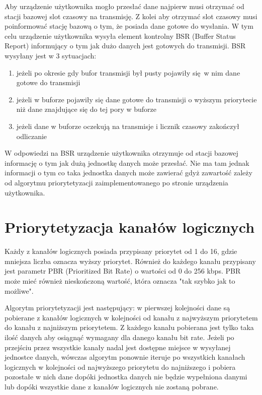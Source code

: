 Aby urządzenie użytkownika mogło przesłać dane najpierw musi otrzymać od stacji bazowej slot czasowy na transmisję. Z kolei aby otrzymać slot czasowy musi poinformować stację bazową o tym, że posiada dane gotowe do wysłania. W tym celu urządzenie użytkownika wysyła element kontrolny BSR (Buffer Status Report) informujący o tym jak dużo danych jest gotowych do transmisji. BSR wysyłany jest w 3 sytuacjach:

\begin{enumerate}
	\item jeżeli po okresie gdy bufor transmisji był pusty pojawiły się w nim dane gotowe do transmisji
	\item jeżeli w buforze pojawiły się dane gotowe do transmisji o wyższym priorytecie niż dane znajdujące się do tej pory w buforze
	\item jeżeli dane w buforze oczekują na transmisje i licznik czasowy zakończył odliczanie
\end{enumerate}

W odpowiedzi na BSR urządzenie użytkownika otrzymuje od stacji bazowej informację o tym jak dużą jednostkę danych może przesłać. Nie ma tam jednak informacji o tym co taka jednostka danych może zawierać gdyż zawartość zależy od algorytmu priorytetyzacji zaimplementowanego po stronie urządzenia użytkownika.

\section{Priorytetyzacja kanałów logicznych}

Każdy z kanałów logicznych posiada przypisany priorytet od 1 do 16, gdzie mniejsza liczba oznacza wyższy priorytet. Również do każdego kanału przypisany jest parametr PBR (Prioritized Bit Rate) o wartości od 0 do 256 kbps. PBR może mieć również nieskończoną wartość, która oznacza "tak szybko jak to możliwe".

Algorytm priorytetyzacji jest następujący: w pierwszej kolejności dane są pobierane z kanałów logicznych w kolejności od kanału z najwyższym priorytetem do kanału z najniższym priorytetem. Z każdego kanału pobierana jest tylko taka ilość danych aby osiągnąć wymagany dla danego kanału bit rate. Jeżeli po przejściu przez wszystkie kanały nadal jest dostępne miejsce w wysyłanej jednostce danych, wówczas algorytm ponownie iteruje po wszystkich kanałach logicznych w kolejności od najwyższego priorytetu do najniższego i pobiera pozostałe w nich dane dopóki jednostka danych nie będzie wypełniona danymi lub dopóki wszystkie dane z kanałów logicznych nie zostaną pobrane.


